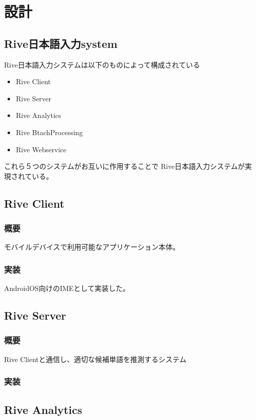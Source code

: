 \chapter{設計}
\label{chap:design}

\section{Rive日本語入力system}

Rive日本語入力システムは以下のものによって構成されている

\begin{itemize}
  \item Rive Client
  \item Rive Server
  \item Rive Analytics
  \item Rive BtachProcessing
  \item Rive Webservice
\end{itemize}

これら５つのシステムがお互いに作用することで
Rive日本語入力システムが実現されている。



\section{Rive Client}
\subsection{概要}
モバイルデバイスで利用可能なアプリケーション本体。
\subsection{実装}
AndroidOS向けのIMEとして実装した。

\section{Rive Server}
\subsection{概要}
Rive Clientと通信し、適切な候補単語を推測するシステム
\subsection{実装}


\section{Rive Analytics}
